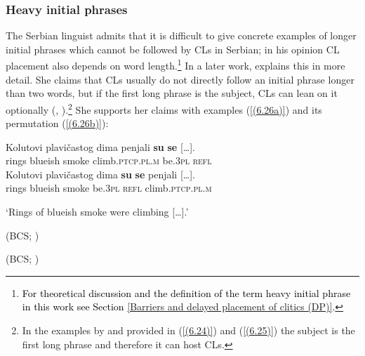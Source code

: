 \subsubsection{Heavy initial phrases}

The Serbian linguist \citet[308]{Pesikan58} admits that it is difficult to give concrete examples of longer initial phrases which cannot be followed by CLs in Serbian; in his opinion CL placement also depends on word length.\footnote{\textcolor{black}{For theoretical discussion and the definition of the term \textcolor{black}{heavy initial phrase} in this work see Section \ref{Barriers and delayed placement of clitics (DP)}.}} In a later work, \citet{RadanovicKocic88} explains this in more detail. She claims that CLs usually do not directly follow an initial phrase longer than two words, but if the first long phrase is the subject, CLs can lean on it optionally (\citealt[cf.][108ff]{RadanovicKocic88}, \citealt[435]{RadanovicKocic96}).\footnote{In the examples by \citet{IKPB11} and \citet{PiperKlajn14} provided in (\ref{(6.24)}) and (\ref{(6.25)}) the subject is the first long phrase and therefore it can host CLs.} She supports her claims with examples (\ref{(6.26a)}) and its permutation (\ref{(6.26b)}): 

\begin{exe}\ex\begin{xlist}\ex\label{(6.26a)}
\begin{xlist}
\gll Kolutovi plavičastog dima penjali \textbf{su} {\textbf{se} [\dots].} \\
 rings blueish smoke climb\textsc{.ptcp.pl.m} be\textsc{.3pl} \textsc{refl} \\
\ex\label{(6.26b)}
\gll Kolutovi plavičastog dima \textbf{su} \textbf{se} {penjali [\dots].} \\
rings blueish smoke be\textsc{.3pl} \textsc{refl} climb\textsc{.ptcp.pl.m}\\
\end{xlist}
\glt ‘Rings of blueish smoke were climbing [\dots].’ \\
\strut\hfill (BCS; \citealt[110]{RadanovicKocic88})


\hfill (BCS; \citealt[119f]{RadanovicKocic88})
\end{xlist}
\end{exe}

